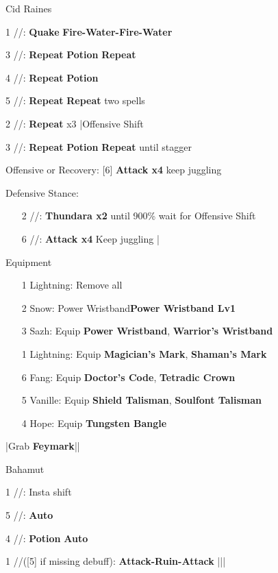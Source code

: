 \begin{fight}{Cid Raines}
	\item [1] \rav/\sen/\syn: \textbf{Quake} \to \textbf{Fire-Water-Fire-Water}
	\item [3] \rav/\sen/\rav: \textbf{Repeat} \to \textbf{Potion} \to \textbf{Repeat}
	\item [4] \rav/\sen/\rav: \textbf{Repeat} \to \textbf{Potion}
	\item [5] \rav/\rav/\syn: \textbf{Repeat} \to \textbf{Repeat} two spells
	\item [2] \rav/\rav/\rav: \textbf{Repeat} x3 |Offensive Shift
	\item [3] \rav/\sen/\rav: \textbf{Repeat} \to \textbf{Potion} \to \textbf{Repeat} until stagger
	\item Offensive or Recovery: [6] \textbf{Attack x4} \to keep juggling
	\item Defensive Stance:
	\begin{itemize}
		\item [2] \rav/\rav/\rav: \textbf{Thundara x2} until 900\% \to wait for Offensive Shift
		\item [6] \com/\com/\rav: \textbf{Attack x4} \to Keep juggling |\skip
	\end{itemize}
\end{fight}
\begin{menu}
	\item Equipment
	\begin{itemize}
		\item [1] Lightning: Remove all
		\item [2] Snow: Power Wristband\star \to \textbf{Power Wristband Lv1}
		\item [3] Sazh: Equip \textbf{Power Wristband\star}, \textbf{Warrior's Wristband}
		\item [1] Lightning: Equip \textbf{Magician's Mark}, \textbf{Shaman's Mark}
		\item [6] Fang: Equip \textbf{Doctor's Code}, \textbf{Tetradic Crown}
		\item [5] Vanille: Equip \textbf{Shield Talisman}, \textbf{Soulfont Talisman}
		\item [4] Hope: Equip \textbf{Tungsten Bangle}
	\end{itemize}
\end{menu}
\begin{mainlist}
	\item \skip|Grab \textbf{Feymark}|\skip|
\end{mainlist}
\begin{fight}{Bahamut}
	\item [1] \com/\rav/\rav: Insta shift
	\item [5] \sab/\com/\rav: \textbf{Auto}
	\item [4] \sen/\med/\med: \textbf{Potion} \to \textbf{Auto}
	\item [1] \com/\rav/\rav ([5] if missing debuff): \textbf{Attack-Ruin-Attack} |\skip||\save
\end{fight}
